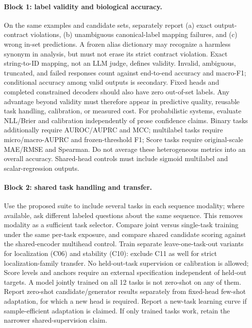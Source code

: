 \paragraph{Block 1: label validity and biological accuracy.}
On the same examples and candidate sets, separately report (a) exact output-contract violations, (b) unambiguous canonical-label mapping failures, and (c) wrong in-set predictions. A frozen alias dictionary may recognize a harmless synonym in analysis, but must not erase its strict contract violation. Exact string-to-ID mapping, not an LLM judge, defines validity. Invalid, ambiguous, truncated, and failed responses count against end-to-end accuracy and macro-F1; conditional accuracy among valid outputs is secondary. Fixed heads and completed constrained decoders should also have zero out-of-set labels. Any advantage beyond validity must therefore appear in predictive quality, reusable task handling, calibration, or measured cost. For probabilistic systems, evaluate NLL/Brier and calibration independently of prose confidence claims. Binary tasks additionally require AUROC/AUPRC and MCC; multilabel tasks require micro/macro-AUPRC and frozen-threshold F1; Score tasks require original-scale MAE/RMSE and Spearman. Do not average these heterogeneous metrics into an overall accuracy. Shared-head controls must include sigmoid multilabel and scalar-regression outputs.

\paragraph{Block 2: shared task handling and transfer.}
Use the proposed suite to include several tasks in each sequence modality; where available, ask different labeled questions about the same sequence. This removes modality as a sufficient task selector. Compare joint versus single-task training under the same per-task exposure, and compare shared candidate scoring against the shared-encoder multihead control. Train separate leave-one-task-out variants for localization (C06) and stability (C10): exclude C11 as well for strict localization-family transfer. No held-out-task supervision or calibration is allowed; Score levels and anchors require an external specification independent of held-out targets. A model jointly trained on all 12 tasks is not zero-shot on any of them. Report zero-shot candidate/generator results separately from fixed-head few-shot adaptation, for which a new head is required. Report a new-task learning curve if sample-efficient adaptation is claimed. If only trained tasks work, retain the narrower shared-supervision claim.

